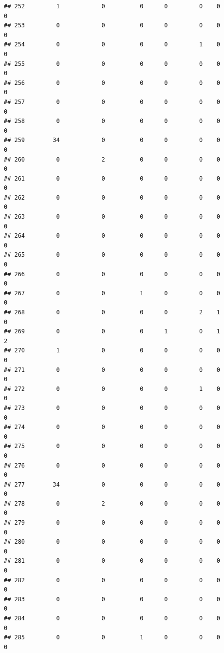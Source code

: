 \documentclass[
]{article}
\begin{document}
\begin{verbatim}
## 252         1            0          0      0         0    0              0
## 253         0            0          0      0         0    0              0
## 254         0            0          0      0         1    0              0
## 255         0            0          0      0         0    0              0
## 256         0            0          0      0         0    0              0
## 257         0            0          0      0         0    0              0
## 258         0            0          0      0         0    0              0
## 259        34            0          0      0         0    0              0
## 260         0            2          0      0         0    0              0
## 261         0            0          0      0         0    0              0
## 262         0            0          0      0         0    0              0
## 263         0            0          0      0         0    0              0
## 264         0            0          0      0         0    0              0
## 265         0            0          0      0         0    0              0
## 266         0            0          0      0         0    0              0
## 267         0            0          1      0         0    0              0
## 268         0            0          0      0         2    1              0
## 269         0            0          0      1         0    1              2
## 270         1            0          0      0         0    0              0
## 271         0            0          0      0         0    0              0
## 272         0            0          0      0         1    0              0
## 273         0            0          0      0         0    0              0
## 274         0            0          0      0         0    0              0
## 275         0            0          0      0         0    0              0
## 276         0            0          0      0         0    0              0
## 277        34            0          0      0         0    0              0
## 278         0            2          0      0         0    0              0
## 279         0            0          0      0         0    0              0
## 280         0            0          0      0         0    0              0
## 281         0            0          0      0         0    0              0
## 282         0            0          0      0         0    0              0
## 283         0            0          0      0         0    0              0
## 284         0            0          0      0         0    0              0
## 285         0            0          1      0         0    0              0

\end{verbatim}
\end{document}
